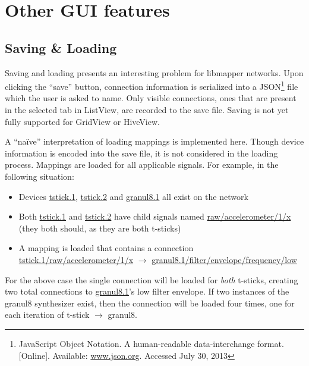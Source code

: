 

\section{Other GUI features} %
\label{sec:other_gui_features}

	\subsection{Saving \& Loading} %
	\label{sec:saving_and_loading}

Saving and loading presents an interesting problem for libmapper networks.  Upon clicking the ``save'' button, connection information is serialized into a JSON\footnote{JavaScript Object Notation. A human-readable data-interchange format. [Online]. Available: \url{www.json.org}. Accessed July 30, 2013} file which the user is asked to name. Only visible connections, ones that are present in the selected tab in ListView, are recorded to the save file. Saving is not yet fully supported for GridView or HiveView.

A ``na\"{i}ve'' interpretation of loading mappings is implemented here. Though device information is encoded into the save file, it is not considered in the loading process. Mappings are loaded for all applicable signals. For example, in the following situation:

\begin{itemize}
	\item Devices \url{tstick.1}, \url{tstick.2} and \url{granul8.1} all exist on the network
	\item Both \url{tstick.1} and \url{tstick.2} have child signals named \url{raw/accelerometer/1/x} (they both should, as they are both t-sticks)
	\item A mapping is loaded that contains a connection \url{tstick.1/raw/accelerometer/1/x} $\rightarrow$ \url{granul8.1/filter/envelope/frequency/low}
\end{itemize}

For the above case the single connection will be loaded for \emph{both} t-sticks, creating two total connections to \url{granul8.1}'s low filter envelope. If two instances of the granul8 synthesizer exist, then the connection will be loaded four times, one for each iteration of t-stick $\rightarrow$ granul8.

